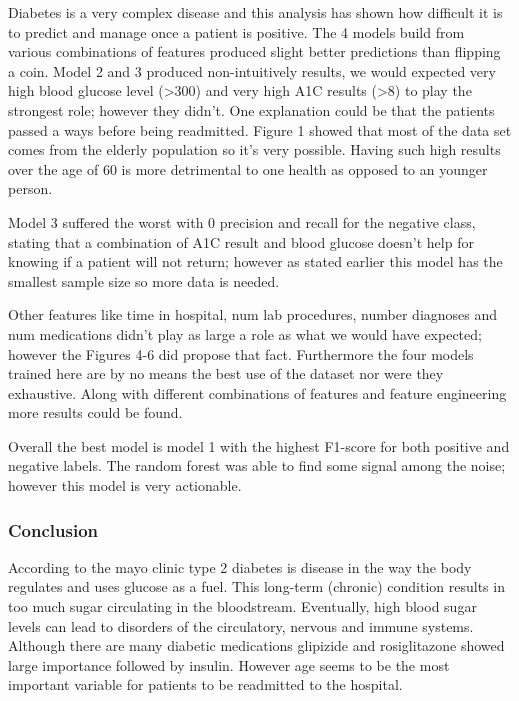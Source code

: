 \documentclass[5p]{elsarticle} %
\begin{document}
Diabetes is a very complex disease and this analysis has shown how
difficult it is to predict and manage once a patient is positive. The 4
models build from various combinations of features produced slight
better predictions than flipping a coin. Model 2 and 3 produced
non-intuitively results, we would expected very high blood glucose level
(\textgreater300) and very high A1C results (\textgreater8) to play the
strongest role; however they didn't. One explanation could be that the
patients passed a ways before being readmitted. Figure 1 showed that
most of the data set comes from the elderly population so it's very
possible. Having such high results over the age of 60 is more
detrimental to one health as opposed to an younger person.

Model 3 suffered the worst with 0 precision and recall for the negative
class, stating that a combination of A1C result and blood glucose
doesn't help for knowing if a patient will not return; however as stated
earlier this model has the smallest sample size so more data is needed.

Other features like time in hospital, num lab procedures, number
diagnoses and num medications didn't play as large a role as what we
would have expected; however the Figures 4-6 did propose that fact.
Furthermore the four models trained here are by no means the best use of
the dataset nor were they exhaustive. Along with different combinations
of features and feature engineering more results could be found.

Overall the best model is model 1 with the highest F1-score for both
positive and negative labels. The random forest was able to find some
signal among the noise; however this model is very actionable.

\hypertarget{conclusion}{%
\subsubsection{Conclusion}\label{conclusion}}

According to the mayo clinic type 2 diabetes is disease in the way the
body regulates and uses glucose as a fuel. This long-term (chronic)
condition results in too much sugar circulating in the bloodstream.
Eventually, high blood sugar levels can lead to disorders of the
circulatory, nervous and immune systems. Although there are many
diabetic medications glipizide and rosiglitazone showed large importance
followed by insulin. However age seems to be the most important variable
for patients to be readmitted to the hospital.
\end{document}
